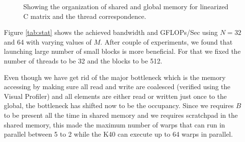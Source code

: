 \documentclass[12pt] {article}
\begin{document}
\begin{figure}[!tbh]
\centering        
   
   \caption{Showing the organization of shared and global memory for linearized C matrix and the thread correspondence.}
   \label{fig:c}
\end{figure}

Figure \ref{tab:stat} shows the achieved bandwidth and GFLOPs/Sec using $N = 32$ and 64 with varying values of $M$. After couple of experiments, we found that launching large number of small blocks is more beneficial. For that we fixed the number of threads to be 32 and the blocks to be 512. 

Even though we have get rid of the major bottleneck which is the memory accessing by making sure all read and write are coalesced (verified using the Visual Profiler) and all elements are either read or written just once to the global, the bottleneck has shifted now to be the occupancy. Since we requires $B$ to be present all the time in shared memory and we requires scratchpad in the shared memory, this made the maximum number of warps that can run in parallel between 5 to 2 while the K40 can execute up to 64 warps in parallel.
\end{document}
